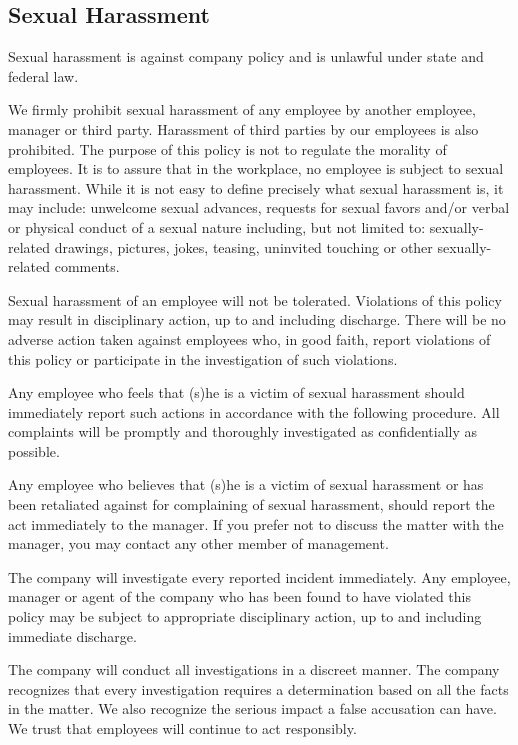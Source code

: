 \subsection{Sexual Harassment}

Sexual harassment is against company policy and is unlawful under state and federal law.

We firmly prohibit sexual harassment of any employee by another employee, manager or third party. Harassment of third parties by our employees is also prohibited. The purpose of this policy is not to regulate the morality of employees. It is to assure that in the workplace, no employee is subject to sexual harassment. While it is not easy to define precisely what sexual harassment is, it may include: unwelcome sexual advances, requests for sexual favors and/or verbal or physical conduct of a sexual nature including, but not limited to: sexually-related drawings, pictures, jokes, teasing, uninvited touching or other sexually-related comments.

Sexual harassment of an employee will not be tolerated. Violations of this policy may result in disciplinary action, up to and including discharge. There will be no adverse action taken against employees who, in good faith, report violations of this policy or participate in the investigation of such violations.

Any employee who feels that (s)he is a victim of sexual harassment should immediately report such actions in accordance with the following procedure. All complaints will be promptly and thoroughly investigated as confidentially as possible.

Any employee who believes that (s)he is a victim of sexual harassment or has been retaliated against for complaining of sexual harassment, should report the act immediately to the manager. If you prefer not to discuss the matter with the manager, you may contact any other member of management.

The company will investigate every reported incident immediately. Any employee, manager or agent of the company who has been found to have violated this policy may be subject to appropriate disciplinary action, up to and including immediate discharge.

The company will conduct all investigations in a discreet manner. The company recognizes that every investigation requires a determination based on all the facts in the matter. We also recognize the serious impact a false accusation can have. We trust that employees will continue to act responsibly.

